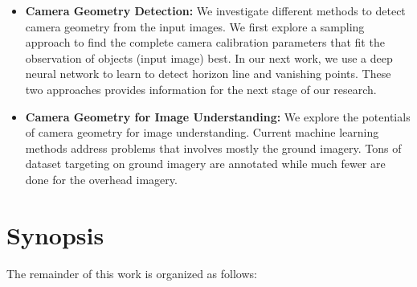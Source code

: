 \begin{itemize}[noitemsep]

  \item \textbf{Camera Geometry Detection:} 
  We investigate different methods to detect camera geometry from the
  input images. We first explore a sampling approach to find the
  complete camera calibration parameters that fit the observation of
  objects (input image) best. In our next work, we use a deep neural
  network to learn to detect horizon line and vanishing points. These
  two approaches provides information for the next stage of our
  research.

  \item \textbf{Camera Geometry for Image Understanding:}
  We explore the potentials of camera geometry for image understanding.
  Current machine learning methods address problems that involves mostly
  the ground imagery. Tons of dataset targeting on ground imagery are
  annotated while much fewer are done for the overhead imagery.

\end{itemize}


\section{Synopsis}

The remainder of this work is organized as follows:
  
